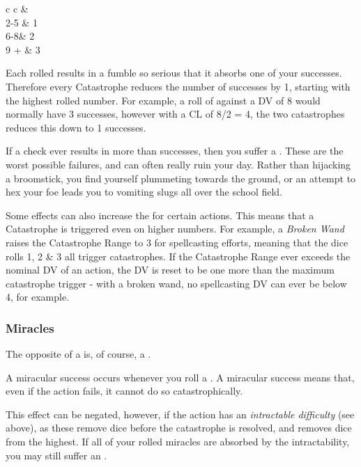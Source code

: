 \begin{center}
	\begin{rndtable}{ c c}
			&	
		\\
		2-5	&	1
		\\
		6-8&	2
		\\
		9 +	&	3
	\end{rndtable}
\end{center}

Each rolled  results in a fumble so serious that it absorbs one of your successes. Therefore every Catastrophe reduces the number of successes by 1, starting with the highest rolled number. For example, a roll of  against a DV of 8 would normally have 3 successes, however with a CL of 8/2 = 4,  the two catastrophes reduces this down to 1 successes. 

If a check ever results in more  than successes, then you suffer a . These are the worst possible failures, and can often really ruin your day. Rather than hijacking a broomstick, you find yourself plummeting towards the ground, or an attempt to hex your foe leads you to vomiting slugs all over the school field. 

Some effects can also increase the  for certain actions. This means that a Catastrophe is triggered even on higher numbers. For example, a {\it Broken Wand} raises the Catastrophe Range to 3 for spellcasting efforts, meaning that the dice rolls 1, 2 \& 3 all trigger catastrophes. If the Catastrophe Range ever exceeds the nominal DV of an action, the DV is reset to be one more than the maximum catastrophe trigger - with a broken wand, no spellcasting DV can ever be below 4, for example.

\subsubsection{Miracles} 

The opposite of a  is, of course, a . 

A miracular success occurs whenever you roll a . A miracular success means that, even if the action fails, it cannot do so catastrophically. 

This effect can be negated, however, if the action has an {\it intractable difficulty} (see above), as these remove dice before the catastrophe is resolved, and removes dice from the highest. If all of your rolled miracles are absorbed by the intractability, you may still suffer an .


